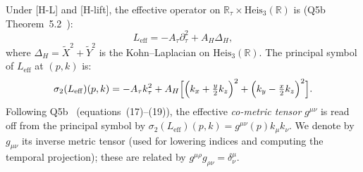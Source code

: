 \documentclass[11pt,a4paper]{article}
\begin{document}
      Under [H-L] and [H-lift], the effective operator on $\mathbb{R}_\tau \times \mathrm{Heis}_3(\mathbb{R})$ is
      (Q5b Theorem~5.2~\cite{Beau2026q5b}):
      \begin{equation}\label{eq:Leff}
        L_{\mathrm{eff}} = -A_\tau\partial_\tau^2 + A_H\Delta_H,
      \end{equation}
      where $\Delta_H = \tilde{X}^2 + \tilde{Y}^2$ is the Kohn--Laplacian on $\mathrm{Heis}_3(\mathbb{R})$.
      The principal symbol of $L_{\mathrm{eff}}$ at $(p,k)$ is:
      \begin{equation}\label{eq:symbol}
        \sigma_2(L_{\mathrm{eff}})(p,k)
        = -A_\tau k_\tau^2 + A_H
        \Bigl[\Bigl(k_x+\tfrac{y}{2}k_z\Bigr)^2+\Bigl(k_y-\tfrac{x}{2}k_z\Bigr)^2\Bigr].
      \end{equation}
      Following Q5b~\cite{Beau2026q5b} (equations~(17)--(19)), the effective \emph{co-metric
  tensor} $g^{\mu\nu}$ is read off from the principal symbol by $\sigma_2(L_{\mathrm{eff}})(p,k)
  = g^{\mu\nu}(p)k_\mu k_\nu$.
      We denote by $g_{\mu\nu}$ its inverse metric tensor (used for lowering indices and
      computing the temporal projection); these are related by $g^{\mu\rho}g_{\rho\nu}
  = \delta^\mu_\nu$.
\end{document}

